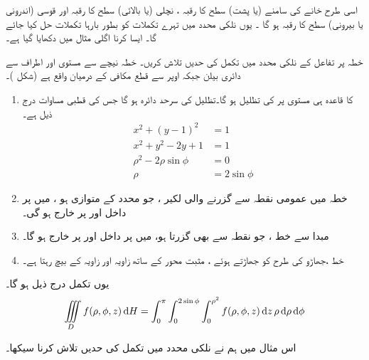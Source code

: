 اسی طرح خانے کی سامنے (یا پشت) سطح کا رقبہ ، نچلی (یا بالائی) سطح   کا رقبہ  اور قوسی  (اندرونی یا بیرونی) سطح کا رقبہ    ہو   گا ۔ یوں  نلکی محدد میں تہرے  تکملات کو  بطور بارہا تکملات حل کیا جائے گا۔ ایسا   کرنا اگلی مثال  میں دکھایا گیا ہے۔

خطہ  پر تفاعل   کے  نلکی محدد میں تکمل  کی حدیں تلاش کریں۔ خطہ  نیچے سے مستوی    اور اطراف سے دائری بیلن
  جبکہ اوپر سے قطع مکافی    کے درمیان واقع ہے (شکل )۔


\begin {enumerate}[1.]
\item
{}\quad
{}  کا  قاعدہ ہی    مستوی  پر  کی تظلیل   ہو گا۔تظلیل  کی سرحد دائرہ  ہو گا  جس کی قطبی مساوات درج ذیل ہے۔
\begin {align*}
x^2+(y-1)^2&=1\\
x^2+y^2-2y+1&=1\\
\rho^2-2\rho\sin\phi&=0\\
\rho&=2\sin\phi
\end {align*}
\item
{}\quad
خطہ  میں عمومی نقطہ  سے گزرنے والی  لکیر ، جو  محدد کے متوازی  ہو ،  میں    پر داخل اور  پر خارج  ہو گی۔
\item
{}\quad
مبدا سے  خط  ، جو نقطہ   سے بھی  گزرتا ہو،  میں  پر داخل اور  پر خارج ہو گا۔
\item
{}\quad
خط   ،جھاڑو کی طرح  کو جھاڑتے ہوئے ،  مثبت محور  کے ساتھ زاویہ   اور زاویہ   کے بیچ رہتا ہے۔
\end {enumerate}
یوں تکمل درج ذیل ہو گا۔
\begin{align*}
\iiint\limits_D f(\rho,\phi,z)\dif H=\int_{0}^{\pi}\int_0^{2\sin\phi}\int_{0}^{\rho^2}f(\rho,\phi,z)\dif z \,\rho\dif \rho\dif \phi
\end{align*}


اس مثال میں ہم نے نلکی محدد میں تکمل کی حدیں تلاش کرنا سیکھا۔



